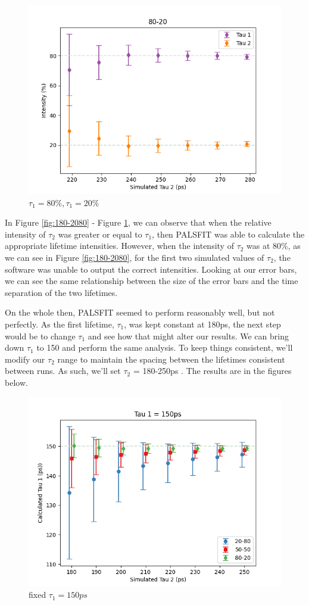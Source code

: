 \begin{figure}
    \centering
    \includegraphics[width=0.8\linewidth]{Batch 1+2/8020.png}
    \caption{$\tau_1 = 80\%, \tau_1 = 20\%$}
    \label{fig:180-8020}
\end{figure}

In Figure \ref{fig:180-2080} - Figure \ref{fig:180-8020}, we can observe that when the relative intensity of $\tau_2$ was greater or equal to $\tau_1$, then PALSFIT was able to calculate the appropriate lifetime intensities. However, when the intensity of $\tau_2$ was at 80\%, as we can see in Figure \ref{fig:180-2080}, for the first two simulated values of $\tau_2$, the software was unable to output the correct intensities. Looking at our error bars, we can see the same relationship between the size of the error bars and the time separation of the two lifetimes.

On the whole then, PALSFIT seemed to perform reasonably well, but not perfectly. As the first lifetime, $\tau_1$, was kept constant at 180ps, the next step would be to change $\tau_1$ and see how that might alter our results. We can bring down $\tau_1$ to 150 and perform the same analysis.  To keep things consistent, we’ll modify our $\tau_2$ range to maintain the spacing between the lifetimes consistent between runs. As such, we’ll set $\tau_2$ = 180-250ps . The results are in the figures below.

\begin{figure}
    \centering
    \includegraphics[width=0.8\linewidth]{Batch 3/regular IRF/tau1 150/output/t1.png}
    \caption{fixed $\tau_1 = 150ps$}
    \label{fig:150-8020}
\end{figure}

